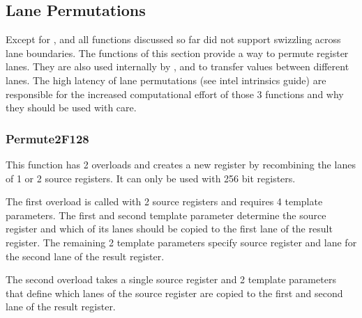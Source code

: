 \subsection{Lane Permutations}

Except for ,  and   all functions discussed so far did not support swizzling across lane boundaries.
The functions of this section provide a way to permute register lanes.
They are also used internally by ,  and  to transfer values between different lanes.
The high latency of lane permutations (see intel intrinsics guide) are responsible for the increased computational effort of those 3 functions and why they should be used with care.

\subsubsection{Permute2F128} 

This function has 2 overloads and creates a new register by recombining the lanes of 1 or 2 source registers.
It can only be used with 256 bit registers.

The first overload is called with 2 source registers and requires 4 template parameters.
The first and second template parameter determine the source register and which of its lanes should be copied to the first lane of the result register.
The remaining 2 template parameters specify source register and lane for the second lane of the result register.

The second overload takes a single source register and 2 template parameters that define which lanes of the source register are copied to the first and second lane of the result register.   

